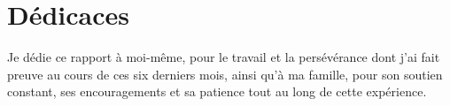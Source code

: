 \chapter*{Dédicaces}
Je dédie ce rapport à moi-même, pour le travail et la persévérance dont j'ai fait preuve au cours de ces six derniers mois,  
ainsi qu'à ma famille, pour son soutien constant, ses encouragements et sa patience tout au long de cette expérience.
